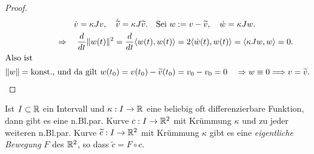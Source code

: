 \documentclass[11pt]{scrbook}
\begin{document}
\begin{lem}
\begin{proof}
\begin{align*} 
\dot v = \kappa J v , \quad \dot{\widetilde v} = \kappa J \widetilde v. \quad \text{Sei } w &:= v - \widetilde v, \quad \dot w = \kappa J w. \\
\Rightarrow \quad \frac{d}{dt} \| w(t) \|^2 = \frac{d}{dt} \langle w(t), w(t)  \rangle &= 2 \langle \dot w(t), w(t) \rangle = \langle \kappa J w, w \rangle = 0. \\
\intertext{Also ist } \| w \| = \text{konst., und da gilt } w(t_0) = v(t_0) - \widetilde v(t_0) &= v_0 - v_0 = 0 \quad \Rightarrow w \equiv 0 \Longrightarrow v = \widetilde v. 
\end{align*}
\end{proof}
\end{lem}

\begin{st}
\label{3.7}
Ist $I \subset \mathbb{R}$  ein Intervall und $\kappa : I \to \mathbb{R}$ eine beliebig oft differenzierbare Funktion, dann gibt es eine n.Bl.par. Kurve $c: I \to \mathbb{R}^2$ mit Krümmung $\kappa$ und zu jeder weiteren n.Bl.par. Kurve $\widetilde c: I \to \mathbb{R}^2$ mit Krümmung $\kappa$ gibt es eine \emph{eigentliche Bewegung} $F$ des $\mathbb{R}^2$, so dass $\tilde c = F \circ c$.


\end{st}
\end{document}
